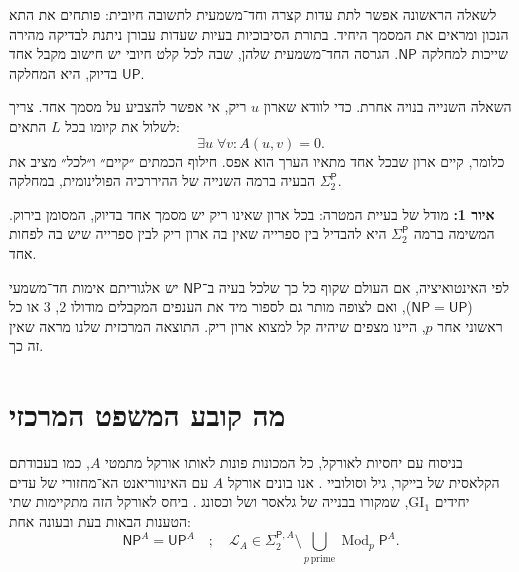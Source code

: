 \documentclass[11pt,a4paper]{article}
\newcommand{\NP}{\mathsf{NP}}
\newcommand{\UP}{\mathsf{UP}}
\newcommand{\PP}{\mathsf P}
\newcommand{\GI}{\mathrm{GI}_1}
\newcommand{\LA}{\mathcal{L}_A}
\newcommand{\MOD}{\operatorname{Mod}}
\newcommand{\hc}[2]{\begin{minipage}{#1}\begin{RTL}\centering #2\end{RTL}\end{minipage}}
\newcommand{\figcap}[2]{\par\smallskip\noindent\textbf{איור #1:} #2\par}
\begin{document}
לשאלה הראשונה אפשר לתת עדות קצרה וחד־משמעית לתשובה חיובית: פותחים את התא הנכון ומראים את המסמך היחיד. בתורת הסיבוכיות בעיות שעדות עבורן ניתנת לבדיקה מהירה שייכות למחלקה $\NP$. הגרסה החד־משמעית שלהן, שבה לכל קלט חיובי יש חישוב מקבל אחד בדיוק, היא המחלקה $\UP$.

השאלה השנייה בנויה אחרת. כדי לוודא שארון $u$ ריק, אי אפשר להצביע על מסמך אחד. צריך לשלול את קיומו בכל $L$ התאים:
\[
  \exists u\;\forall v\colon A(u,v)=0.
\]
כלומר, קיים ארון שבכל אחד מתאיו הערך הוא אפס. חילוף הכמתים ״קיים״ ו״לכל״ מציב את הבעיה ברמה השנייה של ההיררכיה הפולינומית, במחלקה $\Sigma_2^{\PP}$.

\begin{center}
\begin{LTR}
\end{LTR}
\end{center}
\figcap{1}{מודל של בעיית המטרה: בכל ארון שאינו ריק יש מסמך אחד בדיוק, המסומן בירוק. המשימה ברמה $\Sigma_2^{\PP}$ היא להבדיל בין ספרייה שאין בה ארון ריק לבין ספרייה שיש בה לפחות אחד.}

לפי האינטואיציה, אם העולם שקוף כל כך שלכל בעיה ב־$\NP$ יש אלגוריתם אימות חד־משמעי ($\NP=\UP$), ואם לצופה מותר גם לספור מיד את הענפים המקבלים מודולו $2$, $3$ או כל ראשוני אחר $p$, היינו מצפים שיהיה קל למצוא ארון ריק. התוצאה המרכזית שלנו מראה שאין זה כך.

\section{מה קובע המשפט המרכזי}
בניסוח עם יחסיות לאורקל, כל המכונות פונות לאותו אורקל מתמטי $A$, כמו בעבודתם הקלאסית של בייקר, גיל וסולוביי \cite{bgs}. אנו בונים אורקל $A$ עם האינווריאנט הא־מחזורי של עדים יחידים $\GI$, שמקורו בבנייה של גלאסר ושל וכסונג \cite{gw}. ביחס לאורקל הזה מתקיימות שתי הטענות הבאות בעת ובעונה אחת:
\[
\NP^A=\UP^A
\quad;\quad
\LA\in\Sigma_2^{\PP,A}\setminus
\bigcup_{p\,\mathrm{prime}}\MOD_p\PP^A .
\]
\end{document}
